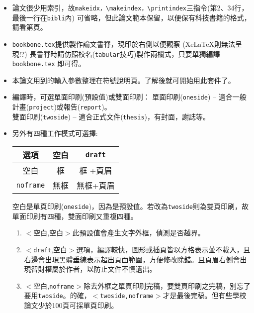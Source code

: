 \begin{itemize}
\item {\color{red}論文很少用索引，故{\tt makeidx，\textbackslash makeindex，\textbackslash printindex}三指令(第2、34行，最後一行在{\tt bibli}內) 可省略，但此論文範本保留，以便保有科技書籍的格式，請看第\framebox{\pageref{others}}頁。}

\item {\tt bookbone.tex}提供製作論文書脊，現印於右側以便觀察 (Xe\LaTeX{}則無法呈現!?) 
長書脊時請仿照校名({\tt tabular}技巧)製作兩欄式，只要單獨編譯{\tt bookbone.tex} 即可得。 

\item 本論文用到的輸入參數整理在符號說明頁。了解後就可開始用此套件了。\label{conclude}

\item 編譯時，可選單面印刷(預設值)或雙面印刷： %
單面印刷({\tt oneside}) -- 適合一般計畫({\tt project})或報告({\tt report})。\\
雙面印刷({\tt twoside}) -- 適合正式文件({\tt thesis})，有封面，謝誌等。
\item 另外有四種工作模式可選擇:\\ 
  
{\color{blue}
\begin{center}
\begin{tabular}{|c|c|c|} \hline 
 選項          &  空白    &  {\tt  draft}      \\ \hline 
 空白          &    框    &    框 +頁眉      \\ \hline
{\tt noframe}  &    無框  &    無框+頁眉   \\ \hline
\end{tabular}
\end{center}
}
空白是單頁印刷({\tt oneside})，因為是預設值。若改為{\tt twoside}則為雙頁印刷，故單面印刷有四種，雙面印刷又重複四種。

\begin{enumerate}
\item $<$空白,空白$>$此預設值會產生文字外框，偵測是否越界。
\item $<${\tt draft},空白$>$選項，編譯較快，圖形或插頁皆以方格表示並不載入，且右邊會出現黑體垂線表示超出頁面範圍，方便修改除錯。且頁眉右側會出現智財權屬於作者，以防止文件不慎遺出。
\item$<$空白,{\tt noframe}$>$除去外框之{\color{red}單頁印刷完稿}，要雙頁印刷之完稿，別忘了要用{\tt twoside}{\color{red}。的確，$<${\tt twoside,noframe}$>$才是最後完稿。}但有些學校論文少於100頁可採單頁印刷。



\end{enumerate}
\end{itemize}
